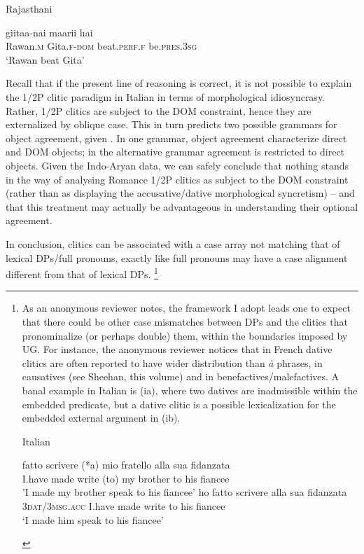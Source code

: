 \documentclass[output=paper]{langscibook}
\begin{document}
\ea\label{ex:manzini:}
Rajasthani \citep{Khokhlova2002}\\
\begin{xlist}
\ex {}   {giitaa-nai}  {maarii}    {hai}\\
Rawan\textsc{.m}   Gita.\textsc{f-dom}   beat.\textsc{perf.f}    be.\textsc{pres.3sg}\\
\glt ‘Rawan beat Gita’
\end{xlist}
\z

Recall that if the present line of reasoning is correct, it is not possible to explain the 1/2P clitic paradigm in Italian in terms of morphological idiosyncrasy. Rather, 1/2P clitics are subject to the DOM constraint, hence they are externalized by oblique case. This in turn predicts two possible grammars for object agreement, given . In one grammar, object agreement characterize direct and DOM objects; in the alternative grammar agreement is restricted to direct objects. Given the Indo-Aryan data, we can safely conclude that nothing stands in the way of analysing Romance 1/2P clitics as subject to the DOM constraint (rather than as displaying the accusative/dative morphological syncretism) – and that this treatment may actually be advantageous in understanding their optional agreement. 

In conclusion, clitics can be associated with a case array not matching that of lexical DPs/full pronouns, exactly like full pronouns may have a case alignment different from that of lexical DPs.{} \footnote{As an anonymous reviewer notes, the framework I adopt leads one to expect that there could be other case mismatches between DPs and the clitics that pronominalize (or perhaps double) them, within the boundaries imposed by UG. For instance, the anonymous reviewer notices that in French dative clitics are often reported to have wider distribution than \textit{à} phrases, in causatives (see Sheehan, this volume) and in benefactives/malefactives. A banal example in Italian is (ia), where two datives are inadmissible within the embedded predicate, but a dative clitic is a possible lexicalization for the embedded external argument in (ib). 

\ea\label{ex:manzini:}
Italian\\
\begin{xlist}
\ex {} {fatto} {scrivere} (*a) {mio} {fratello} {alla} {sua} {fidanzata}\\
{I.have} made write (to) my brother to his fiancee\\
\glt 'I made my brother speak to his fiancee'
\ex {}     {ho} {fatto} {scrivere}   {alla} {sua} {fidanzata}\\
{3\textsc{dat}/\textsc{3msg.acc}} {I.have} made write   to his fiancee\\
\glt ‘I made him speak to his fiancee’
\end{xlist}
\z
}
\end{document}
